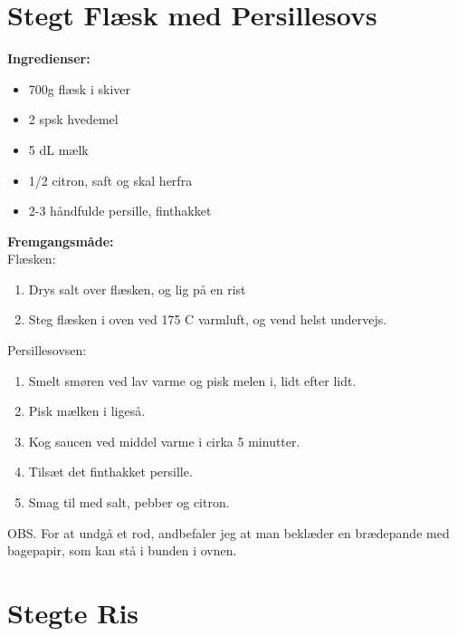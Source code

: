 \documentclass{book}
\begin{document}
\newpage \section{Stegt Flæsk med Persillesovs}
\begin{minipage}[t]{0.5\textwidth}
\textbf{Ingredienser:}
\begin{itemize}
    \item 700g flæsk i skiver
    \item 2 spsk hvedemel
    \item 5 dL mælk
    \item 1/2 citron, saft og skal herfra
    \item 2-3 håndfulde persille, finthakket
\end{itemize}
\end{minipage}
\begin{minipage}[t]{0.5\textwidth}
\textbf{Fremgangsmåde:}
\\Flæsken:
\begin{enumerate}
    \item Drys salt over flæsken, og lig på en rist
    \item Steg flæsken i oven ved 175 \degree C varmluft, og vend helst undervejs.
\end{enumerate}
Persillesovsen:
\begin{enumerate}
    \item Smelt smøren ved lav varme og pisk melen i, lidt efter lidt.
    \item Pisk mælken i ligeså.
    \item Kog saucen ved middel varme i cirka 5 minutter.
    \item Tilsæt det finthakket persille.
    \item Smag til med salt, pebber og citron.
\end{enumerate}
\end{minipage}
OBS. For at undgå et rod, andbefaler jeg at man beklæder en brædepande med bagepapir, som kan stå i bunden i ovnen.
\newpage 
{}
\newpage \section{Stegte Ris}
\end{document}
